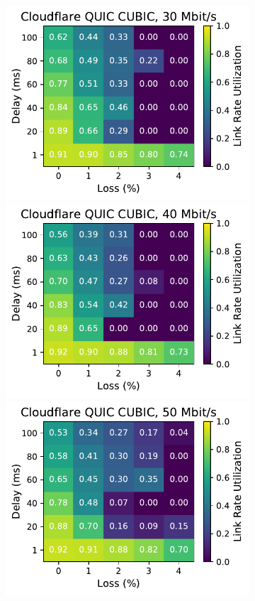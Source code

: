 \begin{figure}[ht]
\begin{subfigure}[b]{0.22\linewidth}
        \includegraphics[width=\linewidth,trim={0 0 2cm 0},clip]{figures/heatmaps/heatmap_quiche_cubic_30mbps.pdf}
        \includegraphics[width=\linewidth,trim={0 0 2cm 0},clip]{figures/heatmaps/heatmap_quiche_cubic_40mbps.pdf}
        \includegraphics[width=\linewidth,trim={0 0 2cm 0},clip]{figures/heatmaps/heatmap_quiche_cubic_50mbps.pdf}

\end{subfigure}
\end{figure}
